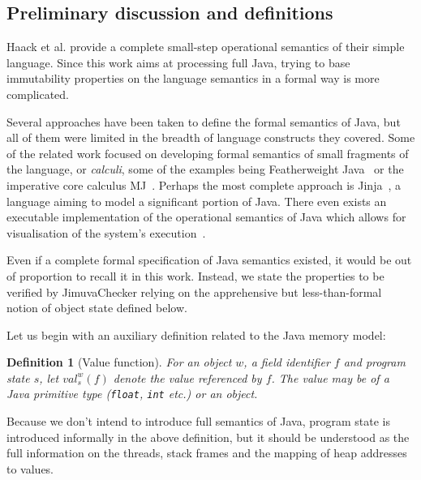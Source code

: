 \documentclass{pracamgr}
\theoremstyle{all}
\newtheorem{defi}{Definition}[chapter]
\begin{document}
\subsection{Preliminary discussion and definitions}

Haack et al. provide a complete small-step operational semantics of
their simple language. Since this work aims at processing full Java,
trying to base immutability properties on the language semantics in a
formal way is more complicated.

Several approaches have been taken to define the formal semantics of
Java, but all of them were limited in the breadth of language
constructs they covered. Some of the related work focused on
developing formal semantics of small fragments of the language, or
\emph{calculi}, some of the examples being Featherweight
Java~\cite{javasem:feather} or the imperative core calculus
MJ~\cite{javasem:mj}. Perhaps the most complete approach is
Jinja~\cite{javasem:jinja}, a language aiming to model a significant
portion of Java. There even exists an executable implementation of the
operational semantics of Java which allows for visualisation of the
system's execution~\cite{javasem:exec}. 

Even if a complete formal specification of Java semantics existed, it
would be out of proportion to recall it in this work. Instead, we
state the properties to be verified by JimuvaChecker relying on the
apprehensive but less-than-formal notion of object state defined below.

Let us begin with an auxiliary definition related to the Java memory
model:
\begin{defi}[Value function]
  For an object $w$, a field identifier $f$ and program state $s$, let
  $val_s^w(f)$ denote the value referenced by $f$. The value may be of
  a Java primitive type (\texttt{float}, \texttt{int} etc.) or an object.
\end{defi}
Because we don't intend to introduce full semantics of Java, program
state is introduced informally in the above definition, but it should
be understood as the full information on the threads, stack frames and
the mapping of heap addresses to values. 
\end{document}
